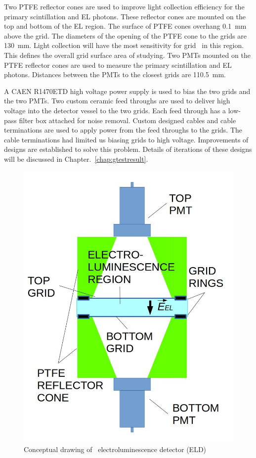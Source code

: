 Two PTFE reflector cones are used to improve light collection efficiency for the primary scintillation and EL photons. These reflector cones are mounted on the top and bottom of the EL region. The surface of PTFE cones overhang \SI{0.1}{mm} above the grid. The diameters of the opening of the PTFE cone to the grids are \SI{130}{mm}. Light collection will have the most sensitivity for grid \eep\ in this region. This defines the overall grid surface area of studying. Two PMTs mounted on the PTFE reflector cones are used to measure the primary scintillation and EL photons. Distances between the PMTs to the closest grids are \SI{110.5}{\mm}.

A CAEN R1470ETD high voltage power supply is used to bias the two grids and the two PMTs. Two custom ceramic feed throughs are used to deliver high voltage into the detector vessel to the two grids. Each feed through has a low-pass filter box attached for noise removal. Custom designed cables and cable terminations are used to apply power from the feed throughs to the grids. The cable terminations had limited us biasing grids to high voltage. Improvements of designs are established to solve this problem. Details of iterations of these designs will be discussed in Chapter.~\ref{chap:gtestresult}.    

\begin{figure}[!tb]
\centering
\includegraphics[width=\halfwidth,clip,trim={0 0 0 0},angle=0,origin=c]{Figures/GasTest/WeiDrawEvent/BasicELD.jpg}
\caption[\gtest\ electroluminescence detector]{Conceptual drawing of \gtest\ electroluminescence detector (ELD)}
\label{fig:BasicELD}
\end{figure}

